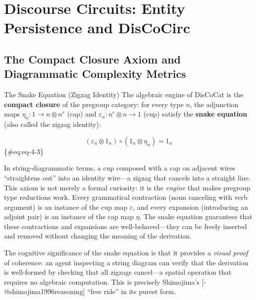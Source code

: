 \documentclass[
  ignorenonframetext,
]{beamer}
\author{\texorpdfstring{}{}}
\date{}
\begin{document}
\section{Discourse Circuits: Entity Persistence and
DisCoCirc}\label{sec:discocirc}

\subsection{The Compact Closure Axiom and Diagrammatic Complexity
Metrics}\label{the-compact-closure-axiom-and-diagrammatic-complexity-metrics}

\begin{frame}[fragile]{The Snake Equation (Zigzag Identity)}
\protect{}\label{the-snake-equation-zigzag-identity}
The algebraic engine of DisCoCat is the \textbf{compact closure} of the
pregroup category: for every type \(n\), the adjunction maps
\(\eta_n: 1 \to n \otimes n^r\) (cap) and
\(\varepsilon_n: n^r \otimes n \to 1\) (cup) satisfy the \textbf{snake
equation} (also called the zigzag identity):

\[(\varepsilon_n \otimes 1_n) \circ (1_n \otimes \eta_n) = 1_n \]
\{\#eq:eq-4-3\}

In string-diagrammatic terms, a cup composed with a cap on adjacent
wires ``straightens out'' into an identity wire---a zigzag that cancels
into a straight line. This axiom is not merely a formal curiosity: it is
the \emph{engine} that makes pregroup type reductions work. Every
grammatical contraction (noun canceling with verb argument) is an
instance of the cup map \(\varepsilon\), and every expansion
(introducing an adjoint pair) is an instance of the cap map \(\eta\).
The snake equation guarantees that these contractions and expansions are
well-behaved---they can be freely inserted and removed without changing
the meaning of the derivation.

The cognitive significance of the snake equation is that it provides a
\emph{visual proof} of coherence: an agent inspecting a string diagram
can verify that the derivation is well-formed by checking that all
zigzags cancel---a spatial operation that requires no algebraic
computation. This is precisely Shimojima's
{[}-@shimojima1996reasoning{]} ``free ride'' in its purest form.


\end{frame}
\end{document}
